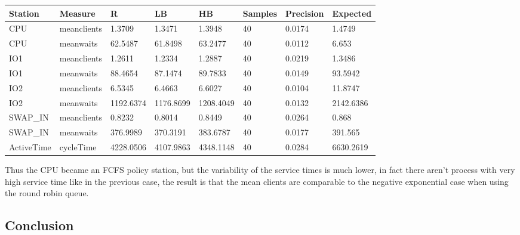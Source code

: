 \documentclass[12pt,a4paper]{article}
\begin{document}
\begin{table}[!ht]
    \centering
    \begin{tabular}{|l|l|l|l|l|l|l|l|}
    \hline
    Station & Measure & R & LB & HB & Samples & Precision & Expected \\ \hline
    CPU & meanclients & 1.3709 & 1.3471 & 1.3948 & 40 & 0.0174 & 1.4749 \\ \hline
    CPU & meanwaits & 62.5487 & 61.8498 & 63.2477 & 40 & 0.0112 & 6.653 \\ \hline
    IO1 & meanclients & 1.2611 & 1.2334 & 1.2887 & 40 & 0.0219 & 1.3486 \\ \hline
    IO1 & meanwaits & 88.4654 & 87.1474 & 89.7833 & 40 & 0.0149 & 93.5942 \\ \hline
    IO2 & meanclients & 6.5345 & 6.4663 & 6.6027 & 40 & 0.0104 & 11.8747 \\ \hline
    IO2 & meanwaits & 1192.6374 & 1176.8699 & 1208.4049 & 40 & 0.0132 & 2142.6386 \\ \hline
    SWAP\_IN & meanclients & 0.8232 & 0.8014 & 0.8449 & 40 & 0.0264 & 0.868 \\ \hline
    SWAP\_IN & meanwaits & 376.9989 & 370.3191 & 383.6787 & 40 & 0.0177 & 391.565 \\ \hline
    ActiveTime & cycleTime & 4228.0506 & 4107.9863 & 4348.1148 & 40 & 0.0284 & 6630.2619 \\ \hline
    \end{tabular}
\end{table}

Thus the CPU became an FCFS policy station, but the variability of the service times is much lower, in fact there aren't process with very high service time like in the previous case, the result is that the mean clients are comparable to the negative exponential case when using the round robin queue. 



\subsection{Conclusion}
\end{document}
